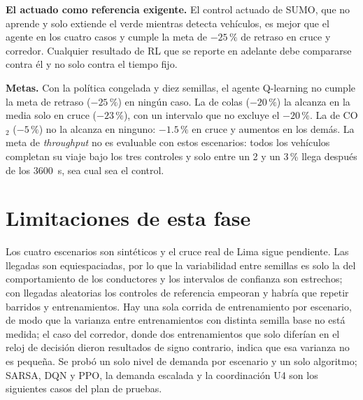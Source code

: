 \noindent\textbf{El actuado como referencia exigente.} El control actuado de
SUMO, que no aprende y solo extiende el verde mientras detecta
vehículos, es mejor que el agente en los cuatro casos y cumple la meta de
$-25\,\%$ de retraso en cruce y corredor. Cualquier resultado de RL que
se reporte en adelante debe compararse contra él y no solo contra el
tiempo fijo.

\noindent\textbf{Metas.} Con la política congelada y diez semillas, el agente
Q-learning no cumple la meta de retraso ($-25\,\%$) en ningún caso. La
de colas ($-20\,\%$) la alcanza en la media solo en cruce ($-23\,\%$),
con un intervalo que no excluye el $-20\,\%$. La de CO$_2$ ($-5\,\%$) no
la alcanza en ninguno: $-1.5\,\%$ en cruce y aumentos en los demás. La
meta de \textit{throughput} no es evaluable con estos escenarios: todos
los vehículos completan su viaje bajo los tres controles y solo entre un
2 y un 3\,\% llega después de los 3600~s, sea cual sea el control.

\section{Limitaciones de esta fase}

Los cuatro escenarios son sintéticos y el cruce real de Lima sigue
pendiente. Las llegadas son equiespaciadas, por lo que la variabilidad
entre semillas es solo la del comportamiento de los conductores y los
intervalos de confianza son estrechos; con llegadas aleatorias los
controles de referencia empeoran y habría que repetir barridos y
entrenamientos. Hay una sola corrida de entrenamiento por escenario, de
modo que la varianza entre entrenamientos con distinta semilla base no
está medida; el caso del corredor, donde dos entrenamientos que solo
diferían en el reloj de decisión dieron resultados de signo contrario,
indica que esa varianza no es pequeña. Se probó un solo nivel de demanda por escenario y un solo
algoritmo; SARSA, DQN y PPO, la demanda escalada y la coordinación U4
son los siguientes casos del plan de pruebas.
